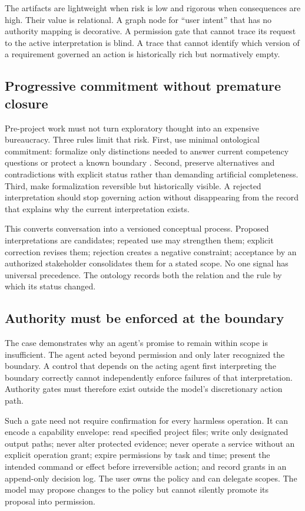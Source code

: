 \documentclass[10pt,a4paper]{article}
\begin{document}
The artifacts are lightweight when risk is low and rigorous when consequences are high. Their value is relational. A graph node for ``user intent'' that has no authority mapping is decorative. A permission gate that cannot trace its request to the active interpretation is blind. A trace that cannot identify which version of a requirement governed an action is historically rich but normatively empty.

\subsection{Progressive commitment without premature closure}

Pre-project work must not turn exploratory thought into an expensive bureaucracy. Three rules limit that risk. First, use minimal ontological commitment: formalize only distinctions needed to answer current competency questions or protect a known boundary \cite{gruber1995}. Second, preserve alternatives and contradictions with explicit status rather than demanding artificial completeness. Third, make formalization reversible but historically visible. A rejected interpretation should stop governing action without disappearing from the record that explains why the current interpretation exists.

This converts conversation into a versioned conceptual process. Proposed interpretations are candidates; repeated use may strengthen them; explicit correction revises them; rejection creates a negative constraint; acceptance by an authorized stakeholder consolidates them for a stated scope. No one signal has universal precedence. The ontology records both the relation and the rule by which its status changed.

\subsection{Authority must be enforced at the boundary}

The case demonstrates why an agent's promise to remain within scope is insufficient. The agent acted beyond permission and only later recognized the boundary. A control that depends on the acting agent first interpreting the boundary correctly cannot independently enforce failures of that interpretation. Authority gates must therefore exist outside the model's discretionary action path.

Such a gate need not require confirmation for every harmless operation. It can encode a capability envelope: read specified project files; write only designated output paths; never alter protected evidence; never operate a service without an explicit operation grant; expire permissions by task and time; present the intended command or effect before irreversible action; and record grants in an append-only decision log. The user owns the policy and can delegate scopes. The model may propose changes to the policy but cannot silently promote its proposal into permission.
\end{document}
